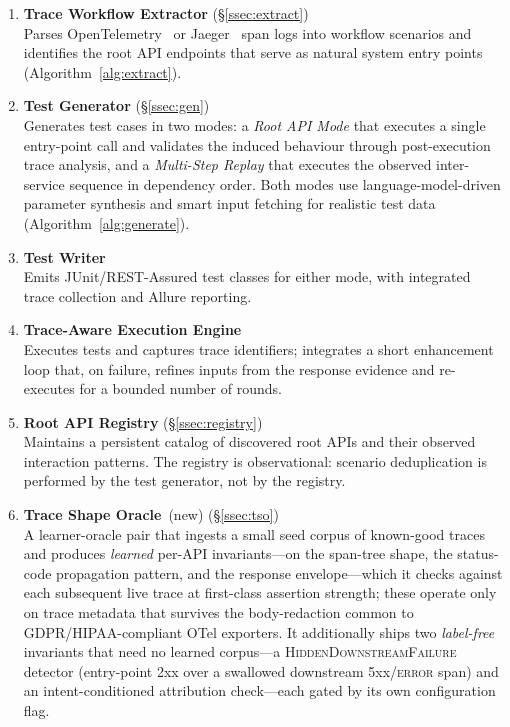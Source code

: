 \documentclass[conference]{IEEEtran}
\begin{document}
\begin{enumerate}[leftmargin=*]
  \item \textbf{Trace Workflow Extractor}
        \hfill(\S\ref{ssec:extract})\\
        Parses OpenTelemetry~\cite{opentelemetry} or Jaeger~\cite{jaeger2017} span logs into workflow scenarios and identifies the root API endpoints that serve as natural system entry points (Algorithm~\ref{alg:extract}).
  \item \textbf{Test Generator}
        \hfill(\S\ref{ssec:gen})\\
        Generates test cases in two modes: a \emph{Root API Mode} that executes a single entry-point call and validates the induced behaviour through post-execution trace analysis, and a \emph{Multi-Step Replay} that executes the observed inter-service sequence in dependency order. Both modes use language-model-driven parameter synthesis and smart input fetching for realistic test data (Algorithm~\ref{alg:generate}).
  \item \textbf{Test Writer}\\
        Emits JUnit/REST-Assured test classes for either mode, with integrated trace collection and Allure reporting.
  \item \textbf{Trace-Aware Execution Engine}\\
        Executes tests and captures trace identifiers; integrates a short enhancement loop that, on failure, refines inputs from the response evidence and re-executes for a bounded number of rounds.
  \item \textbf{Root API Registry}
        \hfill(\S\ref{ssec:registry})\\
        Maintains a persistent catalog of discovered root APIs and their observed interaction patterns. The registry is observational: scenario deduplication is performed by the test generator, not by the registry.
  \item \textbf{Trace Shape Oracle}~(new)
        \hfill(\S\ref{ssec:tso})\\
        A learner-oracle pair that ingests a small seed corpus of known-good traces and produces \emph{learned} per-API invariants---on the span-tree shape, the status-code propagation pattern, and the response envelope---which it checks against each subsequent live trace at first-class assertion strength; these operate only on trace metadata that survives the body-redaction common to GDPR/HIPAA-compliant OTel exporters. It additionally ships two \emph{label-free} invariants that need no learned corpus---a \textsc{HiddenDownstreamFailure} detector (entry-point 2xx over a swallowed downstream 5xx/\textsc{error} span) and an intent-conditioned attribution check---each gated by its own configuration flag.

\end{enumerate}
\end{document}
